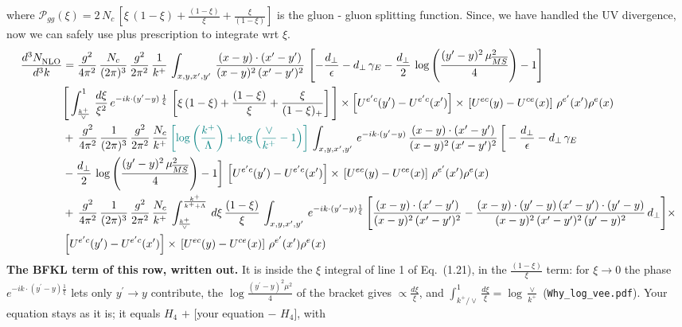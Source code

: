 \documentclass[9pt]{article}
\numberwithin{equation}{section}
\begin{document}
where $\mathcal{P}_{gg}(\xi) = 2\,N_{c}\,\left[\xi\,(1-\xi)+\frac{(1-\xi)}{\xi}+\frac{\xi}{(1-\xi)}\right]$ is the gluon - gluon splitting function. Since, we have handled the UV divergence, now we can safely use plus prescription to integrate wrt $\xi$. 
\begin{align}
    \frac{d^{3}N_{\rm NLO}^{\rm}}{d^{3}k}  & = \frac{g^{2}}{4\pi^{2}}\, \frac{N_{c}}{(2\pi)^{3}}\,\frac{g^{2}}{2\pi^{2}}\, \frac{1}{k^{+}}\,\int_{x,y,x',y'}\,\frac{(x-y)\cdot (x'-y')}{(x-y)^{2}\,(x'-y')^{2}}\,\left[-\frac{d_{\perp}}{\epsilon}-d_{\perp}\,\gamma_{E}-\frac{d_{\perp}}{2}\,\log{\left(\frac{(y'-y)^{2}\,\mu^{2}_{\overline{MS}}}{4}\right)}-1\right]\,\notag \\ & \Bigg[\int_{\frac{k^{+}}{\vee}}^{1}\,\frac{d\xi}{\xi^{2}}\,e^{-ik\cdot (y'-y)\,\frac{1}{\xi}}\,\left[\xi\,(1-\xi)+\frac{(1-\xi)}{\xi}+\frac{\xi}{(1-\xi)_{+}}\right]\Bigg]\times \left[U^{e'c}(y') - U^{e'c}(x')\right] \times\, \left[U^{ec}(y) - U^{ce}(x)\right]\, \rho^{e'}(x') \rho^{e}(x)\notag \\ &  +\, \frac{g^{2}}{4\pi^{2}}\, \frac{1}{(2\pi)^{3}}\,\frac{g^{2}}{2\pi^{2}}\, \frac{N_{c}}{k^{+}}\,{\color{teal}\left[\log{\left(\frac{k^{+}}{\Lambda}\right)}+\log{\left(\frac{\vee}{k^{+}}-1\right)}\right]}\,\int_{x,y,x',y'}\,e^{-ik\cdot (y'-y)}\,\frac{(x-y)\cdot (x'-y')}{(x-y)^{2}\,(x'-y')^{2}}\,\bigg[-\frac{d_{\perp}}{\epsilon}-d_{\perp}\,\gamma_{E}\notag \\ & -\frac{d_{\perp}}{2}\,\log{\left(\frac{(y'-y)^{2}\,\mu^{2}_{\overline{MS}}}{4}\right)}-1\bigg]\,\left[U^{e'c}(y') - U^{e'c}(x')\right] \times\, \left[U^{ec}(y) - U^{ce}(x)\right]\, \rho^{e'}(x') \rho^{e}(x)\notag \\ & +\,\frac{g^{2}}{4\pi^{2}}\, \frac{1}{(2\pi)^{3}}\,\frac{g^{2}}{2\pi^{2}}\, \frac{N_{c}}{k^{+}}\,\int_{\frac{k^{+}}{\vee}}^{\frac{k^{+}}{k^{+}+\Lambda}}\,d\xi\, \frac{(1-\xi)}{\xi}\, \int_{x,y,x',y'}\,e^{-ik\cdot (y'-y)\frac{1}{\xi}}\,\Bigg[\frac{(x-y)\cdot (x'-y')}{(x-y)^{2}\, (x'-y')^{2}} -\frac{(x-y)\cdot (y'-y)\, (x'-y')\cdot (y'-y)}{(x-y)^{2}\,(x'-y')^{2}\,(y'-y)^{2}}\,d_{\perp}\Bigg]\times\notag \\ &  \left[U^{e'c}(y') - U^{e'c}(x')\right] \times\, \left[U^{ec}(y) - U^{ce}(x)\right]\, \rho^{e'}(x') \rho^{e}(x)
\end{align}
{\color{blue}\noindent\textbf{The BFKL term of this row, written out.} It is inside the $\xi$ integral of line 1 of Eq.~(1.21), in the $\frac{(1-\xi)}{\xi}$ term: for $\xi\to0$ the phase $e^{-ik\cdot(y^\prime-y)\frac{1}{\xi}}$ lets only $y^\prime\to y$ contribute, the $\log\frac{(y^\prime-y)^2\mu^2}{4}$ of the bracket gives $\propto\frac{d\xi}{\xi}$, and $\int_{k^+/\vee}^1\frac{d\xi}{\xi}=\log\frac{\vee}{k^+}$ (\texttt{Why\_log\_vee.pdf}). Your equation stays as it is; it equals $H_4$ $+$ [your equation $-$ $H_4$], with}
\end{document}
